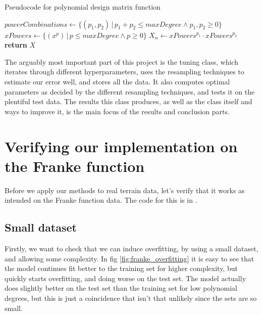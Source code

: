 \documentclass[11pt, a4paper]{report}
\begin{document}
\begin{algorithm}
\caption{Pseudocode for polynomial design matrix function}
\begin{algorithmic}[0]
    \State $powerCombinations \gets \{(p_1, p_2)\, |\, p_1 + p_2 \leq maxDegree \land p_1, p_2 \geq 0\}$
    \State $xPowers \gets \{(x^p)\, |\, p \leq maxDegree \land p \geq 0\}$
        \State $X_n \gets xPowers^{p_1} \cdot xPowers^{p_2}$
    \EndFor
    \State \textbf{return} $X$
\EndProcedure
\end{algorithmic}
\end{algorithm}

The arguably most important part of this project is the tuning class, which iterates through different hyperparameters, uses the resampling techniques to estimate our error well, and stores all the data. It also computes optimal parameters as decided by the different resampling techniques, and tests it on the plentiful test data. The results this class produces, as well as the class itself and ways to improve it, is the main focus of the results and conclusion parts.

\chapter{Verifying our implementation on the Franke function}

Before we apply our methods to real terrain data, let's verify that it works as intended on the Franke function data. The code for this is in .

\section{Small dataset}

Firstly, we want to check that we can induce overfitting, by using a small dataset, and allowing some complexity. In fig \ref{fig:franke_overfitting} it is easy to see that the model continues fit better to the training set for higher complexity, but quickly starts overfitting, and doing worse on the test set. The model actually does slightly better on the test set than the training set for low polynomial degrees, but this is just a coincidence that isn't that unlikely since the sets are so small.
\end{document}
